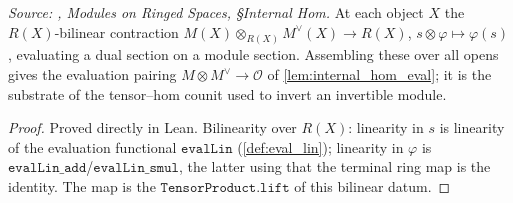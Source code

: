 \begin{definition}\leanok
  \label{def:internal_hom_eval}
  \textit{Source: \cite{stacks-project}, Modules on Ringed Spaces, \S Internal Hom.}
  At each object \(X\) the \(R(X)\)-bilinear contraction \(M(X) \otimes_{R(X)}
  M^\vee(X) \to R(X)\), \(s \otimes \varphi \mapsto \varphi(s)\), evaluating a dual
  section on a module section. Assembling these over all opens gives the evaluation
  pairing \(M \otimes M^\vee \to \mathcal{O}\) of \cref{lem:internal_hom_eval}; it is the
  substrate of the tensor--hom counit used to invert an invertible module.
\end{definition}
\begin{proof}
  \leanok
  Proved directly in Lean. Bilinearity over \(R(X)\): linearity in \(s\) is linearity of
  the evaluation functional \(\mathtt{evalLin}\) (\cref{def:eval_lin}); linearity in
  \(\varphi\) is \(\mathtt{evalLin\_add}\)/\(\mathtt{evalLin\_smul}\), the latter using
  that the terminal ring map is the identity. The map is the
  \(\mathtt{TensorProduct.lift}\) of this bilinear datum.
\end{proof}

